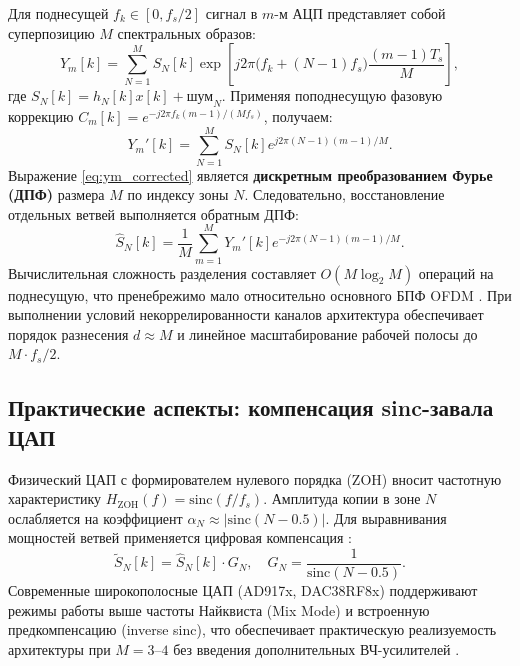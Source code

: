 \documentclass[a4paper,12pt]{article}
\numberwithin{equation}{section}
\begin{document}
Для поднесущей $f_k \in [0, f_s/2]$ сигнал в $m$-м АЦП представляет собой суперпозицию $M$ спектральных образов:
\begin{equation}
    Y_m[k] = \sum_{N=1}^{M} S_N[k] \exp\left[ j 2\pi \bigl( f_k + (N-1)f_s \bigr) \frac{(m-1)T_s}{M} \right],
    \label{eq:ym_general}
\end{equation}
где $S_N[k] = h_N[k] x[k] + \text{шум}_N$. Применяя поподнесущую фазовую коррекцию $C_m[k] = e^{-j 2\pi f_k (m-1)/(M f_s)}$, получаем:
\begin{equation}
    Y_m'[k] = \sum_{N=1}^{M} S_N[k] e^{j 2\pi (N-1)(m-1)/M}.
    \label{eq:ym_corrected}
\end{equation}
Выражение \eqref{eq:ym_corrected} является \textbf{дискретным преобразованием Фурье (ДПФ)} размера $M$ по индексу зоны $N$. Следовательно, восстановление отдельных ветвей выполняется обратным ДПФ:
\begin{equation}
    \hat{S}_N[k] = \frac{1}{M} \sum_{m=1}^{M} Y_m'[k] e^{-j 2\pi (N-1)(m-1)/M}.
    \label{eq:idft_recover}
\end{equation}
Вычислительная сложность разделения составляет $O(M \log_2 M)$ операций на поднесущую, что пренебрежимо мало относительно основного БПФ OFDM \cite{vaidyanathan}. При выполнении условий некоррелированности каналов архитектура обеспечивает порядок разнесения $d \approx M$ и линейное масштабирование рабочей полосы до $M \cdot f_s/2$.

\subsection{Практические аспекты: компенсация sinc-завала ЦАП}
\label{subsec:dac_comp}

Физический ЦАП с формирователем нулевого порядка (ZOH) вносит частотную характеристику $H_\text{ZOH}(f) = \text{sinc}(f/f_s)$. Амплитуда копии в зоне $N$ ослабляется на коэффициент $\alpha_N \approx |\text{sinc}(N-0.5)|$. Для выравнивания мощностей ветвей применяется цифровая компенсация \cite{adi_ds}:
\begin{equation}
    \tilde{S}_N[k] = \hat{S}_N[k] \cdot G_N, \quad G_N = \frac{1}{\text{sinc}(N-0.5)}.
    \label{eq:sinc_comp}
\end{equation}
Современные широкополосные ЦАП (AD917x, DAC38RF8x) поддерживают режимы работы выше частоты Найквиста (Mix Mode) и встроенную предкомпенсацию (inverse sinc), что обеспечивает практическую реализуемость архитектуры при $M=3$--$4$ без введения дополнительных ВЧ-усилителей \cite{walden, ieee_std1241_2023, razavi}.
\end{document}
